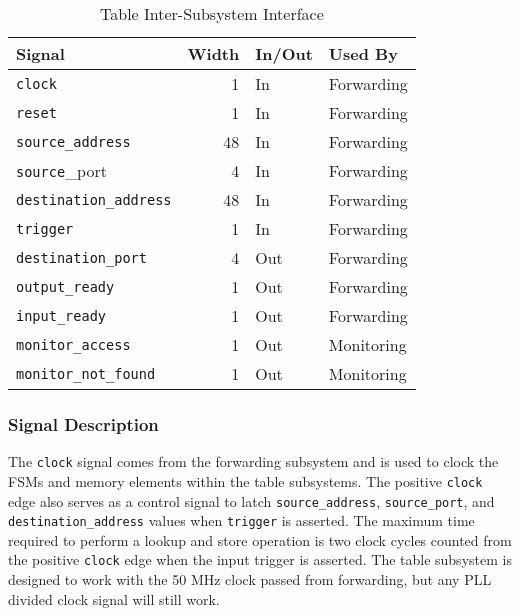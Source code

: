 \documentclass{article}
\begin{document}
\begin{table}[h]
    \begin{center}
        \begin{tabular}{lrll}\hline
        Signal & Width & In/Out & Used By \\
        \hline
        \texttt{clock} & 1 & In & Forwarding \\
        \hline
        \texttt{reset} & 1 & In & Forwarding \\
        \hline
        \texttt{source\_address} & 48 & In & Forwarding \\
        \hline
        \texttt{source}\_port & 4 & In & Forwarding \\
        \hline
        \texttt{destination\_address} & 48 & In & Forwarding \\
        \hline
        \texttt{trigger} & 1 & In & Forwarding \\
        \hline
        \texttt{destination\_port} & 4 & Out & Forwarding \\
        \hline
        \texttt{output\_ready} & 1 & Out & Forwarding \\
        \hline
        \texttt{input\_ready} & 1 & Out & Forwarding \\
        \hline
        \texttt{monitor\_access} & 1 & Out & Monitoring \\
        \hline
        \texttt{monitor\_not\_found} & 1 & Out & Monitoring \\
        \hline
        \end{tabular}
        \caption{Table Inter-Subsystem Interface}\label{tab:a}
    \end{center}
\end{table}

\subsubsection{Signal Description}

The \texttt{clock} signal comes from the forwarding subsystem and is used to clock the FSMs and memory elements within the table subsystems. The positive \texttt{clock} edge also serves as a control signal to latch \texttt{source\_address}, \texttt{source\_port}, and \texttt{destination\_address} values when \texttt{trigger} is asserted. The maximum time required to perform a lookup and store operation is two clock cycles counted from the positive \texttt{clock} edge when the input trigger is asserted. The table subsystem is designed to work with the 50 MHz clock passed from forwarding, but any PLL divided clock signal will still work. 
\end{document}
